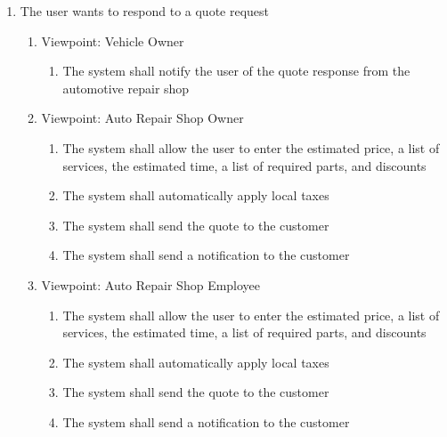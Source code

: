 \documentclass[12pt]{article}
\begin{document}
\begin{enumerate}[resume*=business_events]
	\item The user wants to respond to a quote request
	      \begin{enumerate}[VP\arabic*.]
		      \item Viewpoint: Vehicle Owner
		            \begin{enumerate}
			            \item The system shall notify the user of the quote response from the automotive repair shop
		            \end{enumerate}
		      \item Viewpoint: Auto Repair Shop Owner
		            \begin{enumerate}
			            \item The system shall allow the user to enter the estimated price, a list of services, the estimated
			                  time, a list of required parts, and discounts
			            \item The system shall automatically apply local taxes
			            \item The system shall send the quote to the customer
			            \item The system shall send a notification to the customer
		            \end{enumerate}
		      \item Viewpoint: Auto Repair Shop Employee
		            \begin{enumerate}
			            \item The system shall allow the user to enter the estimated price, a list of services, the estimated
			                  time, a list of required parts, and discounts
			            \item The system shall automatically apply local taxes
			            \item The system shall send the quote to the customer
			            \item The system shall send a notification to the customer
		            \end{enumerate}
	      \end{enumerate}


\end{enumerate}
\end{document}
